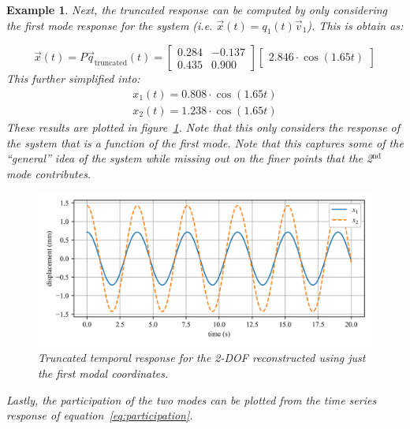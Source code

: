 \documentclass[12pt,letter]{article}
\newtheorem{ex}{Example}
\numberwithin{ex}{section} %
\newenvironment{example}{\begin{mdframed}[middlelinewidth=0.5mm]\begin{ex}\normalfont}{\end{ex}\end{mdframed}}
\numberwithin{re}{section} %
\begin{document}
\begin{example}
Next, the truncated response can be computed by only considering the first mode response for the system (i.e. $\vec{x}(t) = q_1(t) \vec{v}_1$). This is obtain as:

\begin{equation}
\vec{x}(t) = P\vec{q}_\text{truncated}(t) = \begin{bmatrix} 0.284 & -0.137 \\    0.435  & 0.900 \end{bmatrix}  \begin{bmatrix} 2.846 \cdot \cos (1.65 t) \end{bmatrix}
\end{equation}
This further simplified into:
\begin{eqnarray}
x_1(t) = 0.808 \cdot \cos (1.65 t) \\ 
x_2(t) = 1.238 \cdot \cos (1.65 t) \nonumber
\end{eqnarray}
These results are plotted in figure~\ref{fig:modal_analysis_free_vibration_truncated}. Note that this only considers the response of the system that is a function of the first mode. Note that this captures some of the ``general'' idea of the system while missing out on the finer points that the 2$^{\text{nd}}$ mode contributes. 

\begin{figure}[H]
	\centering
	\includegraphics[width=\linewidth]{../Figures/modal_analysis_free_vibration_truncated.png}
	\caption{Truncated temporal response for the 2-DOF reconstructed using just the first modal coordinates.}
	\label{fig:modal_analysis_free_vibration_truncated}
\end{figure}

Lastly, the participation of the two modes can be plotted from the time series response of equation~\ref{eq:participation}.


\end{example}
\end{document}

